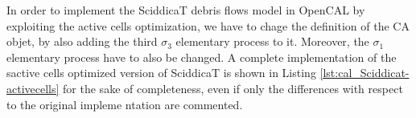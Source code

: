 In order to implement the SciddicaT debris flows model in OpenCAL by
exploiting the active cells optimization, we have to chage the
definition of the CA objet, by also adding the third $\sigma_3$
elementary process to it. Moreover, the $\sigma_1$ elementary process
have to also be changed. A complete implementation of the sactive
cells optimized version of SciddicaT is shown in Listing
\ref{lst:cal_Sciddicat-activecells} for the sake of completeness, even
if only the differences with respect to the original impleme ntation
are commented.










